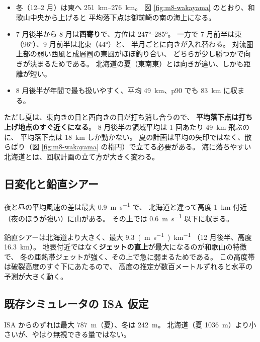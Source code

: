 \begin{itemize}
  \item 冬（12--2 月）は東へ \SIrange{251}{276}{\kilo\metre}。
        図 \ref{fig:m8-wakayama} のとおり、和歌山中央から上げると
        平均落下点は御前崎の南の海上になる。
  \item 7 月後半から 8 月は\textbf{西寄り}で、方位は \ang{247}--\ang{285}。
        一方で 7 月前半は東（\ang{96}）、9 月前半は北東（\ang{44}）と、
        半月ごとに向きが入れ替わる。
        対流圏上部の弱い西風と成層圏の東風がほぼ釣り合い、
        どちらが少し勝つかで向きが決まるためである。
        北海道の夏（東南東）とは向きが違い、しかも距離が短い。
  \item 8 月後半が年間で最も扱いやすく、平均 \SI{49}{\kilo\metre}、p90 でも \SI{83}{\kilo\metre} に収まる。
\end{itemize}

ただし夏は、東向きの日と西向きの日が打ち消し合うので、
\textbf{平均落下点は打ち上げ地点のすぐ近くになる}。
8 月後半の領域平均は 1 回あたり \SI{49}{\kilo\metre} 飛ぶのに、
平均落下点は \SI{18}{\kilo\metre} しか動かない。
夏の計画は平均の矢印ではなく、散らばり（図 \ref{fig:m8-wakayama} の楕円）で立てる必要がある。
海に落ちやすい北海道とは、回収計画の立て方が大きく変わる。

\subsection{日変化と鉛直シアー}




夜と昼の平均風速の差は最大 \SI{0.9}{\metre\per\second} で、
北海道と違って高度 \SI{1}{\kilo\metre} 付近（夜のほうが強い）に山がある。
その上では \SI{0.6}{\metre\per\second} 以下に収まる。

鉛直シアーは北海道より大きく、最大 \SI{9.3}{(\metre\per\second)\per\kilo\metre}
（12 月後半、高度 \SI{16.3}{\kilo\metre}）。
地表付近ではなく\textbf{ジェットの直上}が最大になるのが和歌山の特徴で、
冬の亜熱帯ジェットが強く、その上で急に弱まるためである。
この高度帯は破裂高度のすぐ下にあたるので、
高度の推定が数百メートルずれると水平の予測が大きく動く。

\subsection{既存シミュレータの ISA 仮定}



ISA からのずれは最大 \SI{787}{\metre}（夏）、冬は \SI{242}{\metre}。
北海道（夏 \SI{1036}{\metre}）より小さいが、やはり無視できる量ではない。
